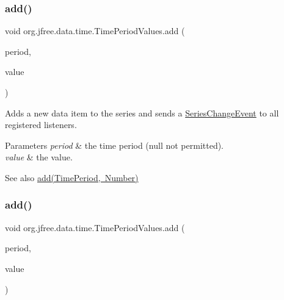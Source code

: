 \subsubsection{\texorpdfstring{add()}{add()}\hspace{0.1cm}{\footnotesize\ttfamily [2/3]}}
{\footnotesize\ttfamily void org.\+jfree.\+data.\+time.\+Time\+Period\+Values.\+add (\begin{DoxyParamCaption}\item[{\mbox{\hyperlink{interfaceorg_1_1jfree_1_1data_1_1time_1_1_time_period}{Time\+Period}}}]{period,  }\item[{double}]{value }\end{DoxyParamCaption})}

Adds a new data item to the series and sends a \mbox{\hyperlink{}{Series\+Change\+Event}} to all registered listeners.


\begin{DoxyParams}{Parameters}
{\em period} & the time period ({\ttfamily null} not permitted). \\
\hline
{\em value} & the value.\\
\hline
\end{DoxyParams}
\begin{DoxySeeAlso}{See also}
\mbox{\hyperlink{classorg_1_1jfree_1_1data_1_1time_1_1_time_period_values_a8adea7222bf714a1e8862b973bb381e4}{add(\+Time\+Period, Number)}} 
\end{DoxySeeAlso}
\mbox{\label{classorg_1_1jfree_1_1data_1_1time_1_1_time_period_values_a8adea7222bf714a1e8862b973bb381e4}} 
\subsubsection{\texorpdfstring{add()}{add()}\hspace{0.1cm}{\footnotesize\ttfamily [3/3]}}
{\footnotesize\ttfamily void org.\+jfree.\+data.\+time.\+Time\+Period\+Values.\+add (\begin{DoxyParamCaption}\item[{\mbox{\hyperlink{interfaceorg_1_1jfree_1_1data_1_1time_1_1_time_period}{Time\+Period}}}]{period,  }\item[{Number}]{value }\end{DoxyParamCaption})}

